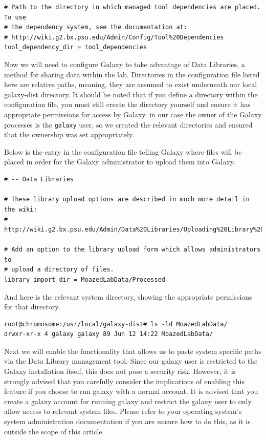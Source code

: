 \documentclass[a4paper,10pt]{article}
\begin{document}
\begin{lstlisting}
# Path to the directory in which managed tool dependencies are placed.  To use
# the dependency system, see the documentation at:
# http://wiki.g2.bx.psu.edu/Admin/Config/Tool%20Dependencies
tool_dependency_dir = tool_dependencies
\end{lstlisting}

Now we will need to configure Galaxy to take advantage of Data Libraries, a method for sharing data within the lab.  Directories in the configuration file listed here are relative paths, meaning, they are assumed to exist underneath our local galaxy-dist directory.  It should be noted that if you define a directory within the configuration file, you must still create the directory yourself and ensure it has appropriate permissions for access by Galaxy.  in our case the owner of the Galaxy processes is the \texttt{\footnotesize{galaxy}} user, so we created the relevant directories and ensured that the ownership was set appropriately.

Below is the entry in the configuration file telling Galaxy where files will be placed in order for the Galaxy administrator to upload them into Galaxy.

\begin{lstlisting}
# -- Data Libraries

# These library upload options are described in much more detail in the wiki:
# http://wiki.g2.bx.psu.edu/Admin/Data%20Libraries/Uploading%20Library%20Files

# Add an option to the library upload form which allows administrators to
# upload a directory of files.
library_import_dir = MoazedLabData/Processed
\end{lstlisting}

And here is the relevant system directory, showing the appropriate permissions for that directory.

\begin{lstlisting}
root@chromosome:/usr/local/galaxy-dist# ls -ld MoazedLabData/
drwxr-xr-x 4 galaxy galaxy 89 Jun 12 14:22 MoazedLabData/
\end{lstlisting}

Next we will enable the functionality that allows us to paste system specific paths via the Data Library management tool.  Since our galaxy user is restricted to the Galaxy installation itself, this does not pose a security risk.  However, it is strongly advised that you carefully consider the implications of enabling this feature if you choose to run galaxy with a normal account.  It is advised that you create a galaxy account for running galaxy and restrict the galaxy user to only allow access to relevant system files.  Please refer to your operating system's system administration documentation if you are unsure how to do this, as it is outside the scope of this article.
\end{document}
